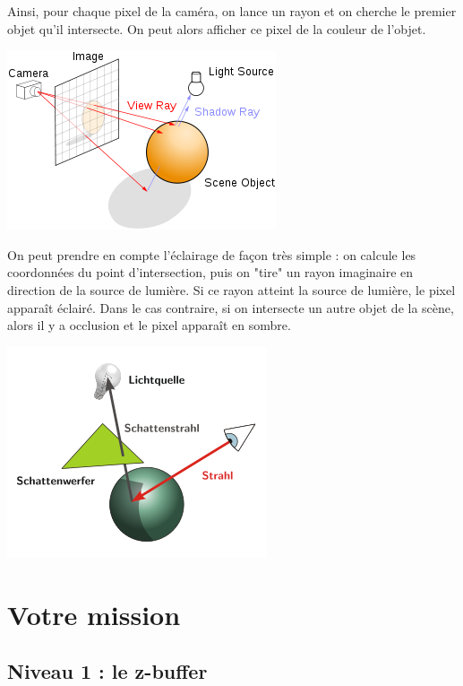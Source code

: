 \documentclass[a4paper, 11pt]{article}
\begin{document}
Ainsi, pour chaque pixel de la caméra, on lance un rayon et on cherche le premier objet qu'il intersecte. On peut alors afficher ce pixel de la couleur de l'objet. 
  
\begin{center}
\includegraphics[scale=0.8]{300px-Ray_trace_diagram.png} 
\end{center}

On peut prendre en compte l'éclairage de façon très simple : on calcule les coordonnées du point d'intersection, puis on "tire" un rayon imaginaire en direction de la source de lumière. Si ce rayon atteint la source de lumière, le pixel apparaît éclairé. Dans le cas contraire, si on intersecte un autre objet de la scène, alors il y a occlusion et le pixel apparaît en sombre.  

\begin{center}
\includegraphics[scale=0.8]{290px-Raytracing-Schattenstrahl.png} 
\end{center}
\newpage

\section{Votre mission}
\subsection*{Niveau 1 : le z-buffer}
\end{document}
